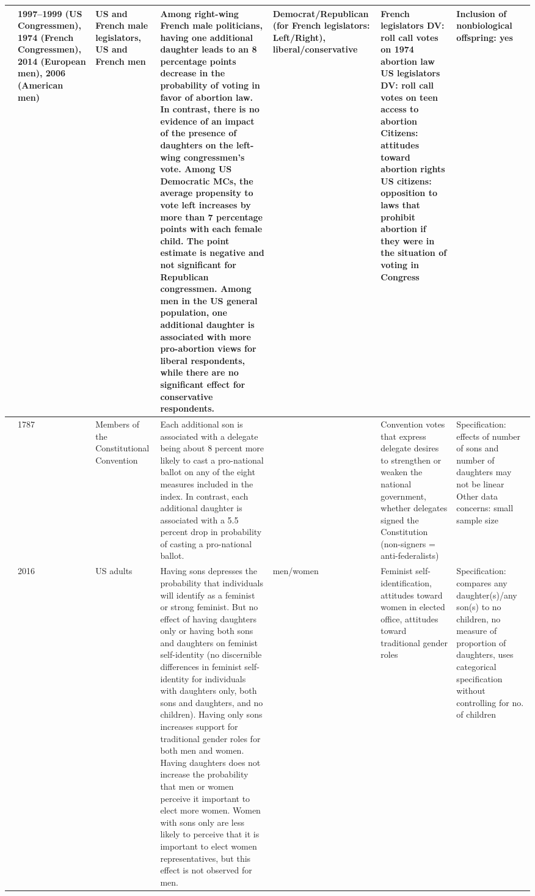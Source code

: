 \begin{longtable}{p{}p{}p{}p{}p{}p{}p{}}
\cite{van2020papa} & 1997–1999 (US Congressmen), 1974 (French Congressmen), 2014 (European men), 2006 (American men) & US and French male legislators, US and French men & Among right-wing French male politicians, having one additional daughter leads to an 8 percentage points decrease in the probability of voting in favor of abortion law.  In contrast, there is no evidence of an impact of the presence of daughters on the left-wing congressmen’s vote. Among US Democratic MCs, the average propensity to vote left increases by more than 7 percentage points with each female child. The point estimate is negative and not significant for Republican congressmen. Among men in the US general population, one additional daughter is associated with more pro-abortion views for liberal respondents, while there are no significant effect for conservative respondents. & Democrat/Republican (for French legislators: Left/Right), liberal/conservative & French legislators DV: roll call votes on 1974 abortion law
US legislators DV: roll call votes on teen access to abortion
Citizens: attitudes toward abortion rights
US citizens: opposition to laws that prohibit abortion if they were in the situation of voting in Congress & Inclusion of nonbiological offspring: yes \\ 
   \midrule
\cite{pope2021father} & 1787 & Members of the Constitutional Convention & Each additional son is associated with a delegate being about 8 percent more likely to cast a pro-national ballot on any of the eight measures included in the index. In contrast, each additional daughter is associated with a 5.5 percent drop in probability of casting a pro-national ballot. &  & Convention votes that express delegate desires to strengthen or weaken the national government, whether delegates signed the Constitution (non-signers = anti-federalists) & Specification: effects of number of sons and number of daughters may not be linear
Other data concerns: small sample size \\ 
   \midrule
\cite{wesley2021effect} & 2016 & US adults & Having sons depresses the probability that individuals will identify as a feminist or strong feminist. But no effect of having daughters only or having both sons and daughters on feminist self-identity (no discernible differences in feminist self-identity for individuals with daughters only, both sons and daughters, and no children). Having only sons increases support for traditional gender roles for both men and women.   Having daughters does not increase the probability that men or women perceive it important to elect more women.  Women with sons only are less likely to perceive that it is important to elect women representatives, but this effect is not observed for men. & men/women & Feminist self-identification, attitudes toward women in elected office, attitudes toward traditional gender roles & Specification: compares any daughter(s)/any son(s) to no children, no measure of proportion of daughters, uses categorical specification without controlling for no. of children

\end{longtable}

